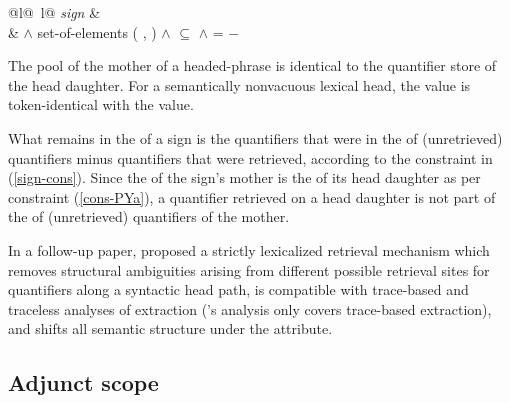 \documentclass[output=paper
 	        ,biblatex
                ,babelshorthands
                ,newtxmath
                ,draftmode
                ,colorlinks, citecolor=brown
]{langscibook}
\begin{document}
\begin{exe}
\ex\label{sign-cons}
\begin{tabular}{@{}l@{~}l@{}}
\emph{sign} \impl&
 \\
& $\land$ set-of-elements ( , )
$\land$  $\subseteq$ 
$\land$  =  $-$ 
\end{tabular}
\end{exe}

\begin{exe}
\ex\label{cons-PY}
\begin{xlist}
\ex \label{cons-PYa} The pool of the mother of a headed-phrase is identical to the quantifier store of the head daughter. 
\ex \label{cons-PYb} For a semantically nonvacuous lexical head, the  value is token-identical with the  value.
\end{xlist}
\end{exe}

\noindent
What remains in the  of a sign is the quantifiers that were in the  of (unretrieved) quantifiers minus quantifiers that were retrieved, according to the  constraint in (\ref{sign-cons}). Since the  of  the sign's mother is the  of its head daughter as per constraint (\ref{cons-PYa}), a quantifier retrieved on a head daughter is not part of the  of (unretrieved) quantifiers of the mother. 

In a follow-up paper, \citet{Przepiorkowski1998b} proposed a strictly lexicalized retrieval mechanism which removes structural ambiguities arising from different possible retrieval sites for quantifiers along a syntactic head path, is compatible with trace-based and traceless analyses of extraction (\citeauthor{PollardandYoo1998}'s analysis only covers trace-based extraction), and shifts all semantic structure under the  attribute.



\subsection{Adjunct scope}
\label{semantics-sec-adjunct-scope}
\end{document}
